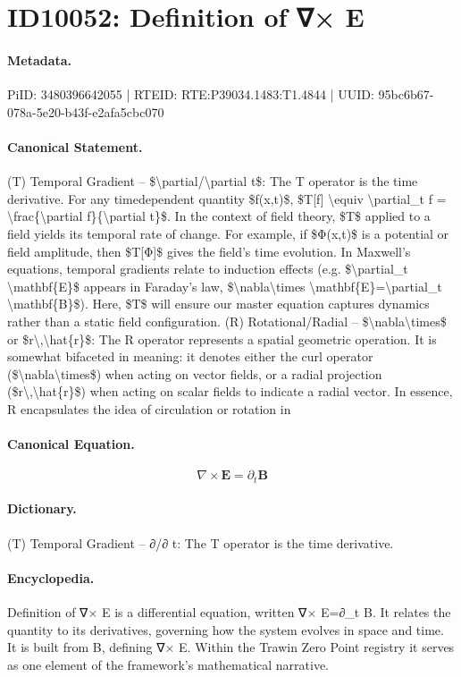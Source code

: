 \section*{ID10052: Definition of ∇× E}
\paragraph{Metadata.}
PiID: 3480396642055 | RTEID: RTE:P39034.1483:T1.4844 | UUID: 95bc6b67-078a-5e20-b43f-e2afa5cbc070

\paragraph{Canonical Statement.}
(T) Temporal Gradient – \$\textbackslash{}partial/\textbackslash{}partial t\$: The T operator is the time derivative. For any timedependent quantity \$f(x,t)\$, \$T[f] \textbackslash{}equiv \textbackslash{}partial\_t f = \textbackslash{}frac\{\textbackslash{}partial f\}\{\textbackslash{}partial t\}\$. In the context of field theory, \$T\$ applied to a field yields its temporal rate of change. For example, if \$Φ(x,t)\$ is a potential or field amplitude, then \$T[Φ]\$ gives the field’s time evolution. In Maxwell’s equations, temporal gradients relate to induction effects (e.g. \$\textbackslash{}partial\_t \textbackslash{}mathbf\{E\}\$ appears in Faraday’s law, \$\textbackslash{}nabla\textbackslash{}times \textbackslash{}mathbf\{E\}=\textbackslash{}partial\_t \textbackslash{}mathbf\{B\}\$). Here, \$T\$ will ensure our master equation captures dynamics rather than a static field configuration. (R) Rotational/Radial – \$\textbackslash{}nabla\textbackslash{}times\$ or \$r\textbackslash{},\textbackslash{}hat\{r\}\$: The R operator represents a spatial geometric operation. It is somewhat bifaceted in meaning: it denotes either the curl operator (\$\textbackslash{}nabla\textbackslash{}times\$) when acting on vector fields, or a radial projection (\$r\textbackslash{},\textbackslash{}hat\{r\}\$) when acting on scalar fields to indicate a radial vector. In essence, R encapsulates the idea of circulation or rotation in

\paragraph{Canonical Equation.}
\[
\nabla\times \mathbf{E}=\partial_t \mathbf{B}
\]

\paragraph{Dictionary.}
(T) Temporal Gradient – ∂/∂ t: The T operator is the time derivative.

\paragraph{Encyclopedia.}
Definition of ∇× E is a differential equation, written ∇× E=∂\_t B. It relates the quantity to its derivatives, governing how the system evolves in space and time. It is built from B, defining ∇× E. Within the Trawin Zero Point registry it serves as one element of the framework's mathematical narrative.
